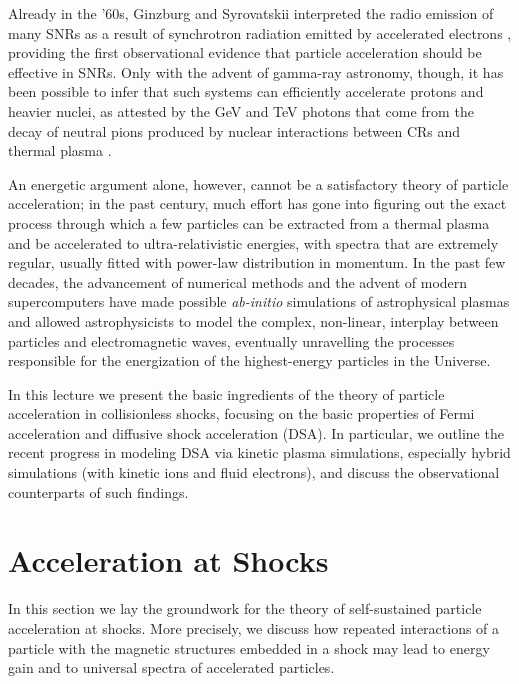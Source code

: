 \documentclass[varenna]{cimento}
\begin{document}
Already in the '60s, Ginzburg and Syrovatskii interpreted the radio emission of many SNRs as a result of synchrotron radiation emitted by accelerated electrons \cite{ginzburg-syrovatskii68}, providing the first observational evidence that particle acceleration should be effective in SNRs. 
Only with the advent of gamma-ray astronomy, though, it has been possible to infer that such systems can efficiently accelerate protons and heavier nuclei, as attested by the GeV and TeV photons that come from the decay of neutral pions produced by nuclear interactions between CRs and thermal plasma \cite{morlino+12,ackermann+13}.

An energetic argument alone, however, cannot be a satisfactory theory of particle acceleration; 
in the past century, much effort has gone into figuring out the exact process through which a few particles can be extracted from a thermal plasma and be accelerated to ultra-relativistic energies, with spectra that are extremely regular, usually fitted with power-law distribution in momentum.
In the past few decades, the advancement of numerical methods and the advent of modern supercomputers have made possible \emph{ab-initio} simulations of astrophysical plasmas and allowed astrophysicists to model the complex, non-linear, interplay between particles and electromagnetic waves, eventually unravelling the processes responsible for the energization of the highest-energy particles in the Universe.

In this lecture we present the basic ingredients of the theory of particle acceleration in collisionless shocks, focusing on the basic properties of Fermi acceleration and diffusive shock acceleration (DSA). 
In particular, we outline the recent progress in modeling DSA via kinetic plasma simulations, especially hybrid simulations (with kinetic ions and fluid electrons), and discuss the observational counterparts of such findings.

\section{Acceleration at Shocks}\label{sec:intro}
In this section we lay the groundwork for the theory of self-sustained particle acceleration at shocks. 
More precisely, we discuss how repeated interactions of a particle with the magnetic structures embedded in a shock may lead to energy gain and to universal spectra of accelerated particles.
\end{document}
